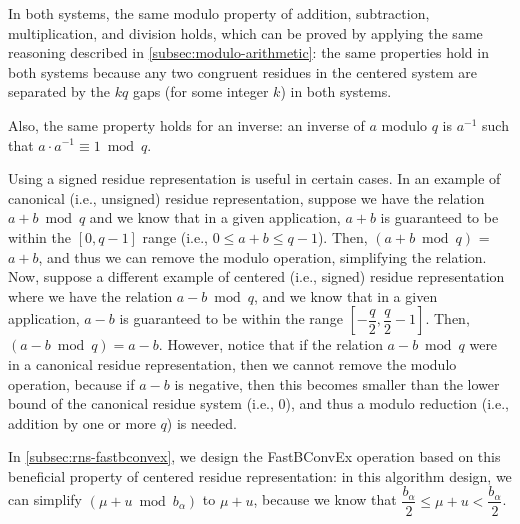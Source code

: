 In both systems, the same modulo property of addition, subtraction, multiplication, and division holds, which can be proved by applying the same reasoning described in \autoref{subsec:modulo-arithmetic}: the same properties hold in both systems because any two congruent residues in the centered system are separated by the $kq$ gaps (for some integer $k$) in both systems. 

Also, the same property holds for an inverse: an inverse of $a$ modulo $q$ is $a^{-1}$ such that $a \cdot a^{-1} \equiv 1 \bmod q$. 

Using a signed residue representation is useful in certain cases. In an example of canonical (i.e., unsigned) residue representation, suppose we have the relation $a + b \bmod q$ and we know that in a given application, $a + b$ is guaranteed to be within the $[0, q-1]$ range (i.e., $0 \leq a + b \leq q-1$). Then, $(a + b \bmod q)$ = $a + b$, and thus we can remove the modulo operation, simplifying the relation. Now, suppose a different example of centered (i.e., signed) residue representation where we have the relation $a - b \bmod q$, and we know that in a given application, $a - b$ is guaranteed to be within the range $\left[-\dfrac{q}{2}, \dfrac{q}{2} - 1\right]$. Then, $(a - b \bmod q) = a - b$. However, notice that if the relation $a - b \bmod q$ were in a canonical residue representation, then we cannot remove the modulo operation, because if $a - b$ is negative, then this becomes smaller than the lower bound of the canonical residue system (i.e., $0$), and thus a modulo reduction (i.e., addition by one or more $q$) is needed. 

In \autoref{subsec:rns-fastbconvex}, we design the \textsf{FastBConvEx} operation based on this beneficial property of centered residue representation: in this algorithm design, we can simplify $(\mu + u \bmod b_\alpha)$ to $\mu + u$, because we know that $\dfrac{b_\alpha}{2} \leq \mu + u < \dfrac{b_\alpha}{2}$.